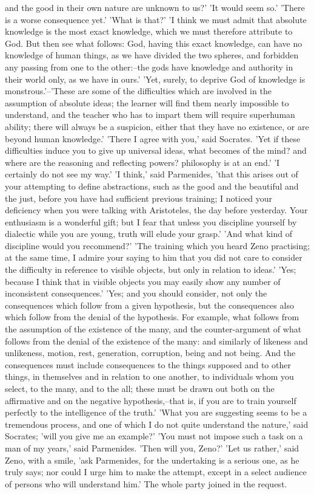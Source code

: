 and the good in their own nature are unknown to us?' 'It would seem so.'
'There is a worse consequence yet.' 'What is that?' 'I think we must
admit that absolute knowledge is the most exact knowledge, which we must
therefore attribute to God. But then see what follows: God, having
this exact knowledge, can have no knowledge of human things, as we
have divided the two spheres, and forbidden any passing from one to the
other:--the gods have knowledge and authority in their world only, as
we have in ours.' 'Yet, surely, to deprive God of knowledge is
monstrous.'--'These are some of the difficulties which are involved
in the assumption of absolute ideas; the learner will find them nearly
impossible to understand, and the teacher who has to impart them will
require superhuman ability; there will always be a suspicion, either
that they have no existence, or are beyond human knowledge.' 'There I
agree with you,' said Socrates. 'Yet if these difficulties induce you
to give up universal ideas, what becomes of the mind? and where are the
reasoning and reflecting powers? philosophy is at an end.' 'I certainly
do not see my way.' 'I think,' said Parmenides, 'that this arises out
of your attempting to define abstractions, such as the good and
the beautiful and the just, before you have had sufficient previous
training; I noticed your deficiency when you were talking with
Aristoteles, the day before yesterday. Your enthusiasm is a wonderful
gift; but I fear that unless you discipline yourself by dialectic
while you are young, truth will elude your grasp.' 'And what kind of
discipline would you recommend?' 'The training which you heard Zeno
practising; at the same time, I admire your saying to him that you did
not care to consider the difficulty in reference to visible objects,
but only in relation to ideas.' 'Yes; because I think that in visible
objects you may easily show any number of inconsistent consequences.'
'Yes; and you should consider, not only the consequences which follow
from a given hypothesis, but the consequences also which follow from the
denial of the hypothesis. For example, what follows from the assumption
of the existence of the many, and the counter-argument of what follows
from the denial of the existence of the many: and similarly of likeness
and unlikeness, motion, rest, generation, corruption, being and not
being. And the consequences must include consequences to the things
supposed and to other things, in themselves and in relation to one
another, to individuals whom you select, to the many, and to the all;
these must be drawn out both on the affirmative and on the negative
hypothesis,--that is, if you are to train yourself perfectly to the
intelligence of the truth.' 'What you are suggesting seems to be a
tremendous process, and one of which I do not quite understand the
nature,' said Socrates; 'will you give me an example?' 'You must not
impose such a task on a man of my years,' said Parmenides. 'Then will
you, Zeno?' 'Let us rather,' said Zeno, with a smile, 'ask Parmenides,
for the undertaking is a serious one, as he truly says; nor could I urge
him to make the attempt, except in a select audience of persons who will
understand him.' The whole party joined in the request.

